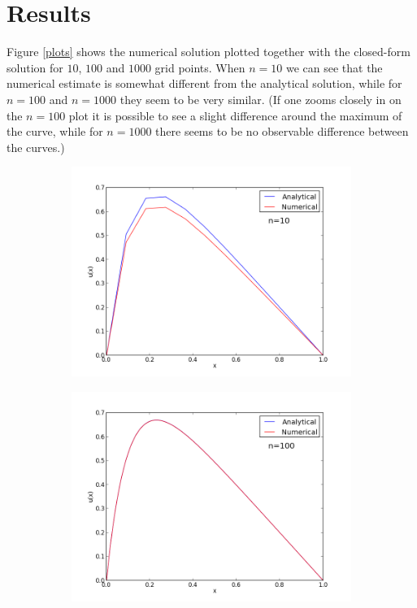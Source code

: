 \documentclass[12pt, a4paper]{article}
\begin{document}
\section{Results}

Figure \ref{plots} shows the numerical solution plotted together with the closed-form solution for 
$10$, $100$ and $1000$ grid points. When $n=10$ we can see that the numerical estimate is somewhat 
different from the analytical solution, while for $n=100$ and $n=1000$ they seem to be very similar. 
(If one zooms closely in on the $n=100$ plot it is possible to see a slight difference around the 
maximum of the curve, while for $n=1000$ there seems to be no observable difference between the curves.) 

\begin{figure}[ht!]
  \centering
  \begin{subfigure}[b]{0.495\textwidth}
		\includegraphics[width=\textwidth]{../Program/plot_n_10.png}
  \end{subfigure}
  \begin{subfigure}[b]{0.495\textwidth}
        \includegraphics[width=\textwidth]{../Program/plot_n_100.png}

\end{subfigure}
\end{figure}
\end{document}
